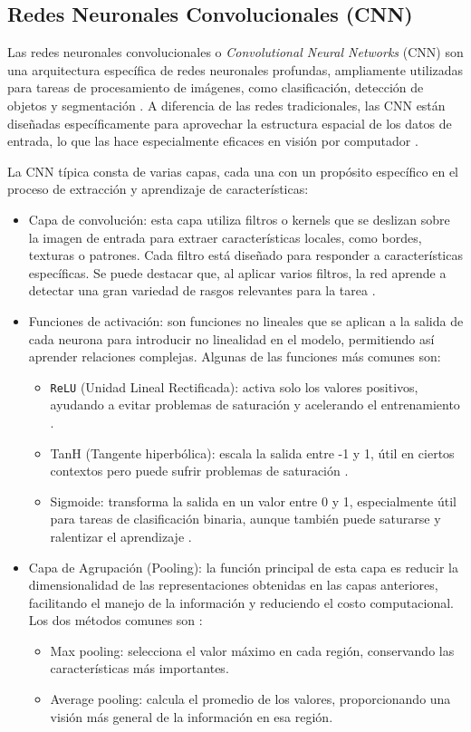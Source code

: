 \subsection{Redes Neuronales Convolucionales (CNN)}
Las redes neuronales convolucionales o \textit{Convolutional Neural Networks} (CNN) son una arquitectura específica de redes neuronales profundas, ampliamente utilizadas para tareas de procesamiento de imágenes, como clasificación, detección de objetos y segmentación \cite{gu2018cnn}. A diferencia de las redes tradicionales, las CNN están diseñadas específicamente para aprovechar la estructura espacial de los datos de entrada, lo que las hace especialmente eficaces en visión por computador \cite{ibmcnn}. 

La CNN típica consta de varias capas, cada una con un propósito específico en el proceso de extracción y aprendizaje de características:  
\begin{itemize}
    \item Capa de convolución: esta capa utiliza filtros o kernels que se deslizan sobre la imagen de entrada para extraer características locales, como bordes, texturas o patrones. Cada filtro está diseñado para responder a características específicas. Se puede destacar que, al aplicar varios filtros, la red aprende a detectar una gran variedad de rasgos relevantes para la tarea \cite{sotil2022cnn}.
    \item Funciones de activación: son funciones no lineales que se aplican a la salida de cada neurona para introducir no linealidad en el modelo, permitiendo así aprender relaciones complejas. Algunas de las funciones más comunes son:
    \begin{itemize}
    \item \texttt{ReLU} (Unidad Lineal Rectificada): activa solo los valores positivos, ayudando a evitar problemas de saturación y acelerando el entrenamiento \cite{ibmcnn}. 
    \item  TanH (Tangente hiperbólica): escala la salida entre -1 y 1, útil en ciertos contextos pero puede sufrir problemas de saturación \cite{deeplearning2016}.
    \item Sigmoide: transforma la salida en un valor entre 0 y 1, especialmente útil para tareas de clasificación binaria, aunque también puede saturarse y ralentizar el aprendizaje \cite{deeplearning2016}.
    \end{itemize}
    \item Capa de Agrupación (Pooling): la función principal de esta capa es reducir la dimensionalidad de las representaciones obtenidas en las capas anteriores, facilitando el manejo de la información y reduciendo el costo computacional. Los dos métodos comunes son \cite{ibmcnn, ajmal2018cnn}:
    \begin{itemize}
        \item Max pooling: selecciona el valor máximo en cada región, conservando las características más importantes.
        \item Average pooling: calcula el promedio de los valores, proporcionando una visión más general de la información en esa región.
    \end{itemize}
\end{itemize}

